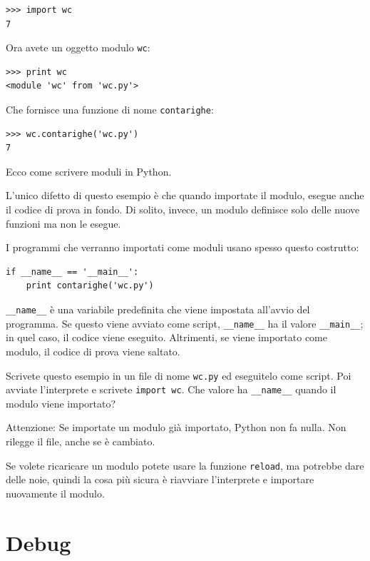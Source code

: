 \documentclass[10pt]{book}
\begin{document}
\begin{verbatim}
>>> import wc
7
\end{verbatim}
%
Ora avete un oggetto modulo {\tt wc}:

\begin{verbatim}
>>> print wc
<module 'wc' from 'wc.py'>
\end{verbatim}
%
Che fornisce una funzione di nome \verb"contarighe":

\begin{verbatim}
>>> wc.contarighe('wc.py')
7
\end{verbatim}
%
Ecco come scrivere moduli in Python.

L'unico difetto di questo esempio è che quando importate il modulo, esegue anche il codice di prova in fondo. Di solito, invece, un modulo definisce solo delle nuove funzioni ma non le esegue.

I programmi che verranno importati come moduli usano spesso questo costrutto:

\begin{verbatim}
if __name__ == '__main__':
    print contarighe('wc.py')
\end{verbatim}
%
\verb"__name__" è una variabile predefinita che viene impostata all'avvio del programma. Se questo viene avviato come script,
\verb"__name__" ha il valore \verb"__main__"; in quel caso, il codice viene eseguito. Altrimenti, se viene importato come modulo, il codice di prova viene saltato.

\vspace{0.2in}
\begin{exercise}

Scrivete questo esempio in un file di nome {\tt wc.py} ed eseguitelo come script. Poi avviate l'interprete e scrivete
{\tt import wc}.  Che valore ha \verb"__name__"
quando il modulo viene importato?

Attenzione: Se importate un modulo già importato, Python non fa nulla. Non rilegge il file, anche se è cambiato.

Se volete ricaricare un modulo potete usare la funzione {\tt reload}, ma potrebbe dare delle noie, quindi la cosa più sicura è riavviare l'interprete e importare nuovamente il modulo.

\end{exercise}



\section{Debug}
\end{document}
